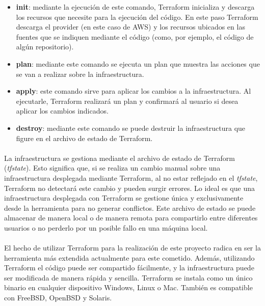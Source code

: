 \documentclass[../../memoria.tex]{subfiles}
\begin{document}
\begin{itemize}
    \item \textbf{init}: mediante la ejecución de este comando, Terraform inicializa y descarga los recursos que necesite para la ejecución del código. En este paso Terraform descarga el provider (en este caso de AWS) y los recursos ubicados en las fuentes que se indiquen mediante el código (como, por ejemplo, el código de algún repositorio).
    \item \textbf{plan}: mediante este comando se ejecuta un plan que muestra las acciones que se van a realizar sobre la infraestructura.

    \item \textbf{apply}: este comando sirve para aplicar los cambios a la infraestructura. Al ejecutarle, Terraform realizará un plan y confirmará al usuario si desea aplicar los cambios indicados.

    \item \textbf{destroy}: mediante este comando se puede destruir la infraestructura que figure en el archivo de estado de Terraform.
\end{itemize}

\paragraph{}
La infraestructura se gestiona mediante el archivo de estado de Terraform (\textit{tfstate}). Esto significa que, si se realiza un cambio manual sobre una infraestructura desplegada mediante Terraform, al no estar reflejado en el \textit{tfstate}, Terraform no detectará este cambio y pueden surgir errores. Lo ideal es que una infraestructura desplegada con Terraform se gestione única y exclusivamente desde la herramienta para no generar conflictos. Este archivo de estado se puede almacenar de manera local o de manera remota para compartirlo entre diferentes usuarios o no perderlo por un posible fallo en una máquina local.

\paragraph{}
El hecho de utilizar Terraform para la realización de este proyecto radica en ser la herramienta más extendida actualmente para este cometido. Además, utilizando Terraform el código puede ser compartido fácilmente, y la infraestructura puede ser modificada de manera rápida y sencilla. Terraform se instala como un único binario en cualquier dispositivo Windows, Linux o Mac. También es compatible con FreeBSD, OpenBSD y Solaris.
\end{document}
